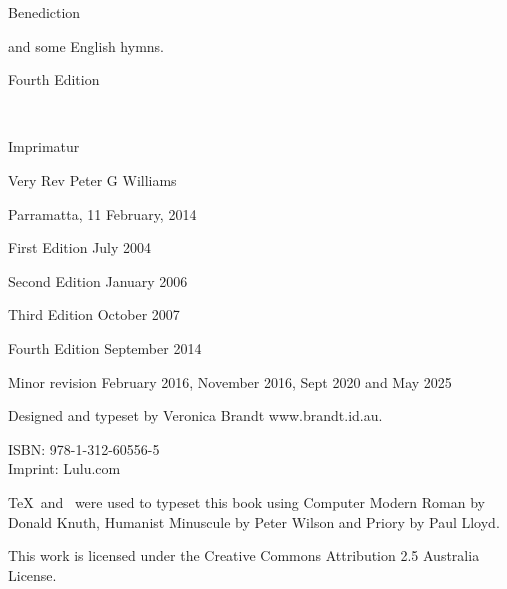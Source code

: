 \centerline{Benediction}

\bigskip

\centerline{and some English hymns.}

\vfill

\centerline{Fourth Edition}

\bigskip

\eject




\ 

\vfill

{\raggedright
{}

\parindent=0mm
\parskip=6pt

Imprimatur
\centerline{Very Rev Peter G Williams}
\rmlyrics

Parramatta, 11 February, 2014

\vfill

First Edition July 2004

Second Edition January 2006

Third Edition October 2007


Fourth Edition September 2014

\qquad Minor revision February 2016, November 2016, Sept 2020 and May 2025

Designed and typeset by Veronica Brandt www.brandt.id.au.

ISBN: 978-1-312-60556-5\\
Imprint: Lulu.com

\TeX\ and \OpusTeX\ were used to typeset this book using
          Computer Modern Roman by Donald Knuth,
          Humanist Minuscule by Peter Wilson
          and Priory by Paul Lloyd.


This work is licensed under the Creative Commons 
Attribution 2.5 Australia License. 

}

